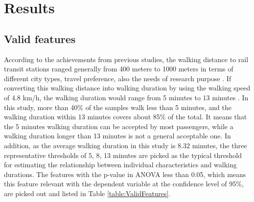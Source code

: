 \documentclass[sustainability,article,submit,moreauthors,pdftex,10pt,a4paper]{Definitions/mdpi}
\begin{document}
\section{Results}
%
\subsection{Valid features}
%
According to the achievements from previous studies, the walking distance to rail transit stations ranged generally from 400 meters to 1000 meters in terms of different city types, travel preference, also the needs of research purpose \cite{guerra2012half,murray1998public,o1996walking,keijer2000people,zhao2003forecasting,alshalalfah2007case}. If converting this walking distance into walking duration by using the walking speed of 4.8 km/h, the walking duration would range from 5 minutes to 13 minutes \cite{bohannon1997comfortable}. In this study, more than 40\% of the samples walk less than 5 minutes, and the walking duration within 13 minutes covers about 85\% of the total. It means that the 5 minutes walking duration can be accepted by most passengers, while a walking duration longer than 13 minutes is not a general acceptable one. In addition, as the average walking duration in this study is 8.32 minutes, the three representative thresholds of 5, 8, 13 minutes are picked as the typical threshold for estimating the relationship between individual characteristics and walking durations. The features with the p-value in ANOVA less than 0.05, which means this feature relevant with the dependent variable at the confidence level of 95\%, are picked out and listed in Table \ref{table:ValidFeatures}.
\end{document}
